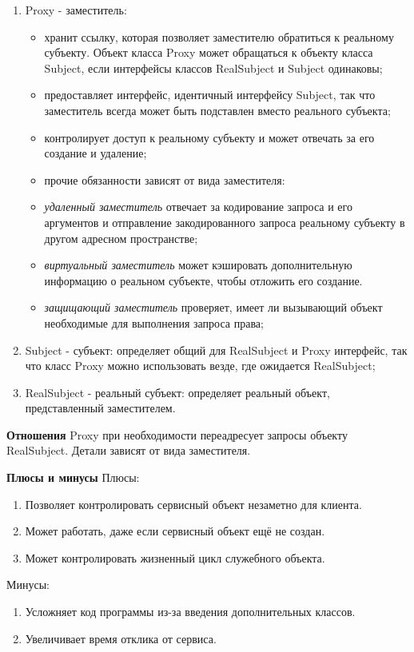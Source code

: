 \documentclass[PI,LAB]{HSEUniversity}
\begin{document}
\begin{enumerate}
	\item Proxy - заместитель:
	\begin{itemize}
		\item хранит ссылку, которая позволяет заместителю обратиться к реальному субъекту. Объект класса Proxy может обращаться к объекту класса Subject, если интерфейсы классов RealSubject и Subject одинаковы;
		\item предоставляет интерфейс, идентичный интерфейсу Subject, так что заместитель всегда может быть подставлен вместо реального субъекта;
		\item контролирует доступ к реальному субъекту и может отвечать за его создание и удаление;
		\item прочие обязанности зависят от вида заместителя:
		\item \textit{удаленный заместитель} отвечает за кодирование запроса и его аргументов и отправление закодированного запроса реальному субъекту в другом адресном пространстве;
		\item \textit{виртуальный заместитель} может кэшировать дополнительную информацию о реальном субъекте, чтобы отложить его создание. 
		\item \textit{защищающий заместитель} проверяет, имеет ли вызывающий объект необходимые для выполнения запроса права;
	\end{itemize}
	\item Subject - субъект: определяет общий для RealSubject и Proxy интерфейс, так что класс Proxy можно использовать везде, где ожидается RealSubject;
	\item RealSubject - реальный субъект: определяет реальный объект, представленный заместителем.
\end{enumerate}

\textbf{Отношения}
Proxy при необходимости переадресует запросы объекту RealSubject. Детали зависят от вида заместителя.

\textbf{Плюсы и минусы}
Плюсы:
\begin{enumerate}
	\item Позволяет контролировать сервисный объект незаметно для клиента.
	\item Может работать, даже если сервисный объект ещё не создан.
	\item Может контролировать жизненный цикл служебного объекта.
\end{enumerate}

Минусы:
\begin{enumerate}
	\item Усложняет код программы из-за введения дополнительных классов. 
	\item Увеличивает время отклика от сервиса.
\end{enumerate}
\end{document}
